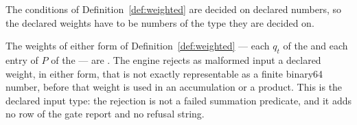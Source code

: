 
The conditions of Definition~\ref{def:weighted} are decided on declared
numbers, so the declared weights have to be numbers of the type they are
decided on.

\begin{requirement}\label{req:binary64-weights}
The weights of either form of Definition~\ref{def:weighted} --- each $q_t$ of
the  and each entry of $P$ of the
 --- are . The engine
rejects as malformed input a declared weight, in either form, that is not
exactly representable as a finite binary64 number, before that weight is used
in an accumulation or a product. This is the declared input type: the
rejection is not a failed summation predicate, and it adds no row of the gate
report and no refusal string.
\end{requirement}
